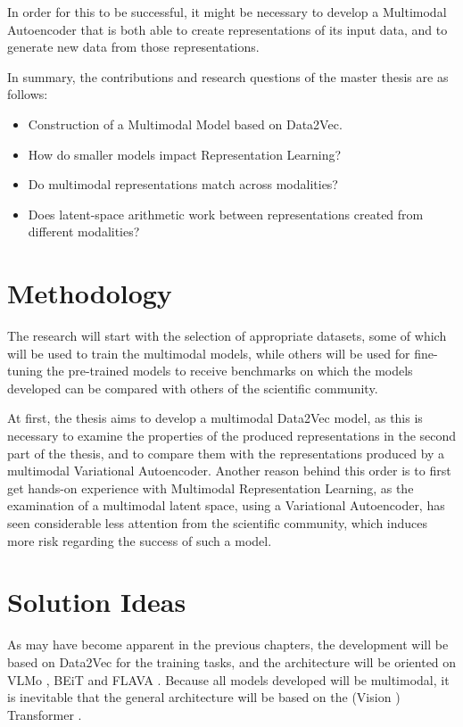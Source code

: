 In order for this to be successful, it might be necessary to develop a Multimodal Autoencoder that is both
able to create representations of its input data, and to generate new data from those representations.

In summary, the contributions and research questions of the master thesis are as follows:

\begin{itemize}
	\item Construction of a Multimodal Model based on Data2Vec.
	\item How do smaller models impact Representation Learning?
    \item Do multimodal representations match across modalities?
	\item Does latent-space arithmetic work between representations created from different modalities?
\end{itemize}

\chapter{Methodology}
The research will start with the selection of appropriate datasets, some of which will be used to
train the multimodal models, while others will be used for fine-tuning the pre-trained models to receive
benchmarks on which the models developed can be compared with others of the scientific community.

At first, the thesis aims to develop a multimodal Data2Vec model, as this is necessary
to examine the properties of the produced representations in the second part of the thesis, and to compare
them with the representations produced by a multimodal Variational Autoencoder.
Another reason behind this order is to first get hands-on experience with Multimodal Representation Learning,
as the examination of a multimodal latent space, using a Variational Autoencoder, has seen considerable less
attention from the scientific community, which induces more risk regarding the success of such a model.

\chapter{Solution Ideas}
As may have become apparent in the previous chapters, the development will be based on Data2Vec \cite{baevski}
for the training tasks, and the architecture will be oriented on VLMo \cite{bao}, BEiT \cite{wang} and FLAVA \cite{singh}.
Because all models developed will be multimodal, it is inevitable that the general architecture will be
based on the (Vision \cite{dosovitskiy}) Transformer \cite{vaswani}.


